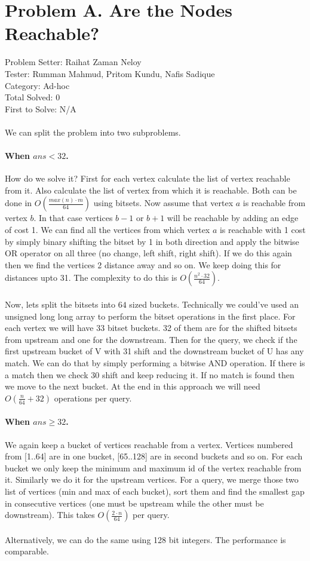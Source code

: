 \section*{Problem A. Are the Nodes Reachable?}
Problem Setter: Raihat Zaman Neloy\\
Tester: Rumman Mahmud, Pritom Kundu, Nafis Sadique\\
Category: Ad-hoc\\
Total Solved: 0 \\
First to Solve: N/A \\
\\
We can split the problem into two subproblems.
\paragraph*{When $ans < 32$.}
How do we solve it? First for each vertex calculate the list of vertex reachable from it. Also
calculate the list of vertex from which it is reachable. Both can be done in $O(\frac{max(n) \cdot m}{64})$ using bitsets.
Now assume that vertex $a$ is reachable from vertex $b$. In that case vertices $b-1$ or $b+1$ will be reachable by 
adding an edge of cost 1. We can find all the vertices from which vertex $a$ is reachable with 1 cost by simply
binary shifting the bitset by 1 in both direction and apply the bitwise OR operator on all three (no change, left shift, right shift).
If we do this again then we find the vertices 2 distance away and so on. We keep doing this for distances upto 31. The
complexity to do this is $O(\frac{n^2 \cdot 32}{64})$. 
\\
\\
Now, lets split the bitsets into $64$ sized buckets. Technically we could've used an unsigned long long array to perform
the bitset operations in the first place. For each vertex we will have 33 bitset buckets. 32 of them are for
the shifted bitsets from upstream and one for the downstream.
Then for the query, we check if the first upstream bucket of V with 31 shift and the downstream bucket of U has any match. We 
can do that by simply performing a bitwise AND operation. If there is a match then we check 30 shift and keep reducing it. If 
no match is found then we move to the next bucket. At the end in this approach we will need $O(\frac{n}{64}+32)$ operations
per query.
\paragraph*{When $ans \ge 32$.}
We again keep a bucket of vertices reachable from a vertex. Vertices numbered from [1..64] are in one bucket, [65..128] are 
in second buckets and so on. For each bucket we only keep the minimum and maximum id of the vertex reachable from it. Similarly we do it 
for the upstream vertices. For a query, we merge those two list of vertices (min and max of each bucket), sort them and find the
smallest gap in consecutive vertices (one must be upstream while the other must be downstream). This takes $O(\frac{2 \cdot n}{64})$ per
query.
\\ 
\\
Alternatively, we can do the same using 128 bit integers. The performance is comparable.
